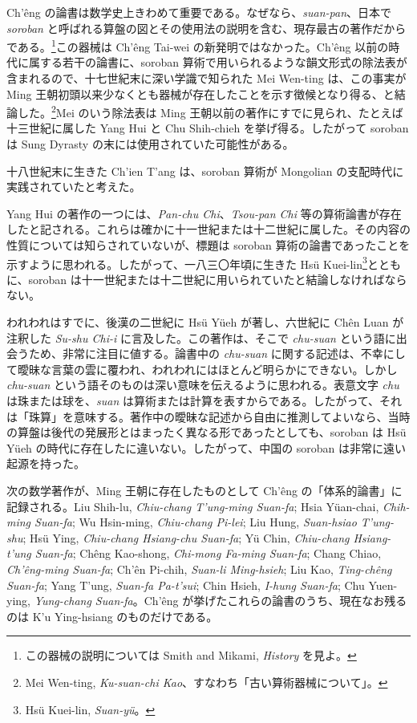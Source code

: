 \documentclass[11pt]{article}
\newcommand{\scanpage}[2]{\clearpage\setcounter{footnote}{0}\noindent{\footnotesize\color{gray}PDF #1 頁 · #2}\par\medskip}
\newcommand{\scanfooter}{}
\begin{document}
Ch'êng の論書は数学史上きわめて重要である。なぜなら、\emph{suan-pan}、日本で \emph{soroban} と呼ばれる算盤の図とその使用法の説明を含む、現存最古の著作だからである。\footnote{この器械の説明については Smith and Mikami, \emph{History} を見よ。}この器械は Ch'êng Tai-wei の新発明ではなかった。Ch'êng 以前の時代に属する若干の論書に、soroban 算術で用いられるような韻文形式の除法表が含まれるので、十七世紀末に深い学識で知られた Mei Wen-ting は、この事実が Ming 王朝初頭以来少なくとも器械が存在したことを示す徴候となり得る、と結論した。\footnote{Mei Wen-ting, \emph{Ku-suan-chi Kao}、すなわち「古い算術器械について」。}Mei のいう除法表は Ming 王朝以前の著作にすでに見られ、たとえば十三世紀に属した Yang Hui と Chu Shih-chieh を挙げ得る。したがって soroban は Sung Dyrasty の末には使用されていた可能性がある。
\scanfooter

\scanpage{0125}{第16章、印刷頁111}
\setcounter{footnote}{0}
十八世紀末に生きた Ch'ien T'ang は、soroban 算術が Mongolian の支配時代に実践されていたと考えた。

Yang Hui の著作の一つには、\emph{Pan-chu Chi}、\emph{Tsou-pan Chi} 等の算術論書が存在したと記される。これらは確かに十一世紀または十二世紀に属した。その内容の性質については知らされていないが、標題は soroban 算術の論書であったことを示すように思われる。したがって、一八三〇年頃に生きた Hsü Kuei-lin\footnote{Hsü Kuei-lin, \emph{Suan-yü}。}とともに、soroban は十一世紀または十二世紀に用いられていたと結論しなければならない。

われわれはすでに、後漢の二世紀に Hsü Yüeh が著し、六世紀に Chên Luan が注釈した \emph{Su-shu Chi-i} に言及した。この著作は、そこで \emph{chu-suan} という語に出会うため、非常に注目に値する。論書中の \emph{chu-suan} に関する記述は、不幸にして曖昧な言葉の雲に覆われ、われわれにはほとんど明らかにできない。しかし \emph{chu-suan} という語そのものは深い意味を伝えるように思われる。表意文字 \emph{chu} は珠または球を、\emph{suan} は算術または計算を表すからである。したがって、それは「珠算」を意味する。著作中の曖昧な記述から自由に推測してよいなら、当時の算盤は後代の発展形とはまったく異なる形であったとしても、soroban は Hsü Yüeh の時代に存在したに違いない。したがって、中国の soroban は非常に遠い起源を持った。

次の数学著作が、Ming 王朝に存在したものとして Ch'êng の「体系的論書」に記録される。Liu Shih-lu, \emph{Chiu-chang T'ung-ming Suan-fa}; Hsia Yüan-chai, \emph{Chih-ming Suan-fa}; Wu Hsin-ming, \emph{Chiu-chang Pi-lei}; Liu Hung, \emph{Suan-hsiao T'ung-shu}; Hsü Ying, \emph{Chiu-chang Hsiang-chu Suan-fa}; Yü Chin, \emph{Chiu-chang Hsiang-t'ung Suan-fa}; Chêng Kao-shong, \emph{Chi-mong Fa-ming Suan-fa}; Chang Chiao, \emph{Ch'êng-ming Suan-fa}; Ch'ên Pi-chih, \emph{Suan-li Ming-hsieh}; Liu Kao, \emph{Ting-chêng Suan-fa}; Yang T'ung, \emph{Suan-fa Pa-t'sui}; Chin Hsieh, \emph{I-hung Suan-fa}; Chu Yuen-ying, \emph{Yung-chang Suan-fa}。Ch'êng が挙げたこれらの論書のうち、現在なお残るのは K'u Ying-hsiang のものだけである。
\end{document}

